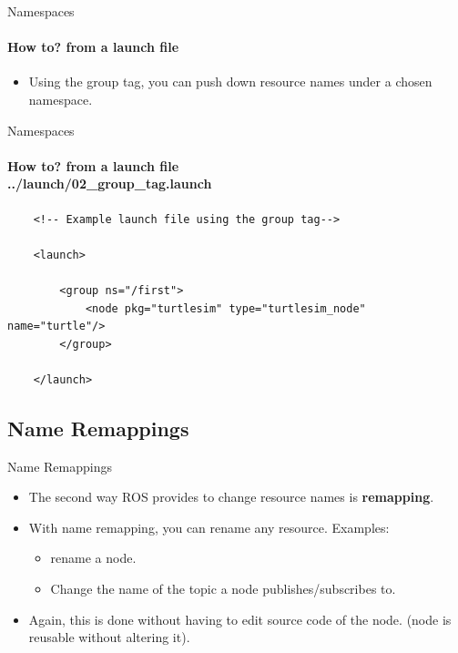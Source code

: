\documentclass{beamer}
\begin{document}
\begin{frame}[fragile]{Namespaces}
    \framesubtitle{How to? from a launch file}
    \begin{itemize}     
        \item Using the  {\ttfamily \colorbox{gray!30!white}{group}} tag, you can push down resource names under a chosen namespace.
    \end{itemize}  
\end{frame}



\begin{frame}[fragile]{Namespaces}
    \framesubtitle{How to? from a launch file  \\ 
        \vspace{0.2cm}
    ../launch/02\_group\_tag.launch}
    \begin{lstlisting}
    <!-- Example launch file using the group tag-->
    
    <launch>
    
        <group ns="/first">
            <node pkg="turtlesim" type="turtlesim_node" name="turtle"/>
        </group>
    
    </launch>
    \end{lstlisting}
\end{frame}


\subsection{Name Remappings}
\begin{frame}{Name Remappings}
    \begin{itemize}

        \item The second way ROS provides to change resource names is \textbf{remapping}.
        
        \item With name remapping, you can rename any resource. Examples:
        \begin{itemize}
            \item rename a node.
            \item Change the name of the topic a node publishes/subscribes to.
        \end{itemize}
        \item Again, this is done without having to edit source code of the node. (node is reusable without altering it).
    \end{itemize}  
\end{frame}
\end{document}
